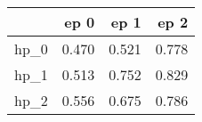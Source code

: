 \begin{tabular}{lrrr}
\toprule
{} &   ep 0 &   ep 1 &   ep 2 \\
\midrule
hp\_0 &  0.470 &  0.521 &  0.778 \\
hp\_1 &  0.513 &  0.752 &  0.829 \\
hp\_2 &  0.556 &  0.675 &  0.786 \\
\bottomrule
\end{tabular}
